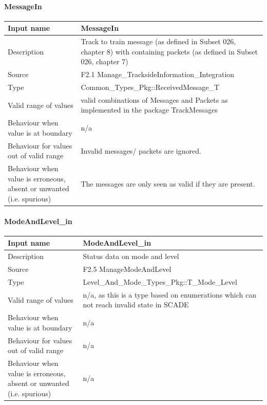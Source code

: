 \paragraph{MessageIn}

\begin{longtable}{p{}p{}}
\toprule
Input name				& MessageIn \\
\midrule
Description				& Track to train message (as defined in Subset 026, chapter 8) with containing packets (as defined in Subset 026, chapter 7) \\
\midrule
Source					& F2.1 Manage\_TracksideInformation\_Integration\\ 
\midrule
Type					& Common\_Types\_Pkg::ReceivedMessage\_T \\
\midrule
Valid range of values	& valid combinations of Messages and Packets as implemented in the package TrackMessages \\
\midrule
Behaviour when value is at boundary	& n/a\\
\midrule
Behaviour for values out of valid range	& Invalid messages/ packets are ignored. \\
\midrule
Behaviour when value is erroneous, absent or unwanted (i.e. spurious) & The messages are only seen as valid if they are present. \\
\bottomrule
\end{longtable}


\paragraph{ModeAndLevel\_in}

\begin{longtable}{p{}p{}}
\toprule
Input name				& ModeAndLevel\_in \\
\midrule
Description				& Status data on mode and level\\
\midrule
Source					& F2.5 ManageModeAndLevel \\ 
\midrule
Type					& Level\_And\_Mode\_Types\_Pkg::T\_Mode\_Level \\
\midrule
Valid range of values	& n/a, as this is a type based on enumerations which can not reach invalid state in SCADE \\
\midrule
Behaviour when value is at boundary	& n/a\\
\midrule
Behaviour for values out of valid range	& n/a\\
\midrule
Behaviour when value is erroneous, absent or unwanted (i.e. spurious) & n/a\\
\bottomrule
\end{longtable}

